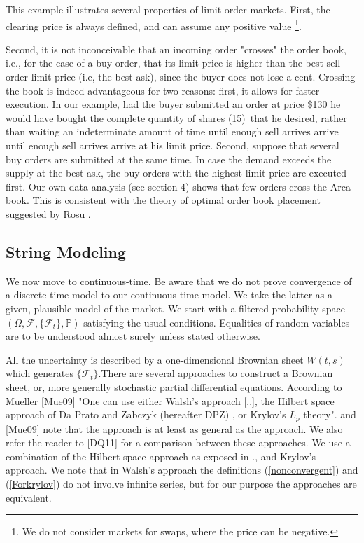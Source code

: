 \documentclass{article}
\begin{document}
This example illustrates several properties of limit order markets. First,
the clearing price is always defined, and can assume any positive value%
\footnote{%
We do not consider markets for swaps, where the price can be negative.}.

Second, it is not inconceivable that an incoming order "crosses" the order
book, i.e., for the case of a buy order, that its limit price is higher than
the best sell order limit price (i.e, the best ask), since the buyer does
not lose a cent. Crossing the book is indeed advantageous for two reasons:
first, it allows for faster execution. In our example, had the buyer
submitted an order at price \$130 he would have bought the complete quantity
of shares (15)\ that he desired, rather than waiting an indeterminate amount
of time until enough sell arrives arrive until enough sell arrives arrive at
his limit price. Second, suppose that several buy orders are submitted at
the same time. In case the demand exceeds the supply at the best ask, the
buy orders with the highest limit price are executed first. Our own data
analysis (see section 4) shows that few orders cross the Arca book. This is
consistent with the theory of optimal order book placement suggested by Rosu
\cite{Ros09}.

\bigskip

\subsection{String Modeling}

We now move to continuous-time. Be aware that we do not prove convergence of
a discrete-time model to our continuous-time model. We take the latter as a
given, plausible model of the market. We start with a filtered probability
space $(\Omega ,\mathcal{F},\{\mathcal{F}_{t}\},\mathbb{P})$ satisfying the
usual conditions. Equalities of random variables are to be understood almost
surely unless stated otherwise.

All the uncertainty is described by a one-dimensional Brownian sheet $W(t,s)$
which generates $\{\mathcal{F}_{t}\}$.There are several approaches to
construct a Brownian sheet, or, more generally stochastic partial
differential equations. According to Mueller [Mue09] "One can use either
Walsh's \cite{Wal86} approach [..], the Hilbert space approach of Da Prato and
Zabczyk (hereafter DPZ) \cite{DPZ92}, or Krylov's \cite{Kry09} $L_{p}$ theory". \cite{DPZ92}
and [Mue09] note that the approach is at least as general as the \cite{Wal86}
approach. We also refer the reader to [DQ11] for a comparison between these
approaches. We use a combination of the Hilbert space approach as exposed in
\cite{CT06}., and Krylov's approach. We note that in Walsh's approach the
definitions (\ref{nonconvergent}) and (\ref{Forkrylov}) do not involve
infinite series, but for our purpose the approaches are equivalent.
\end{document}
